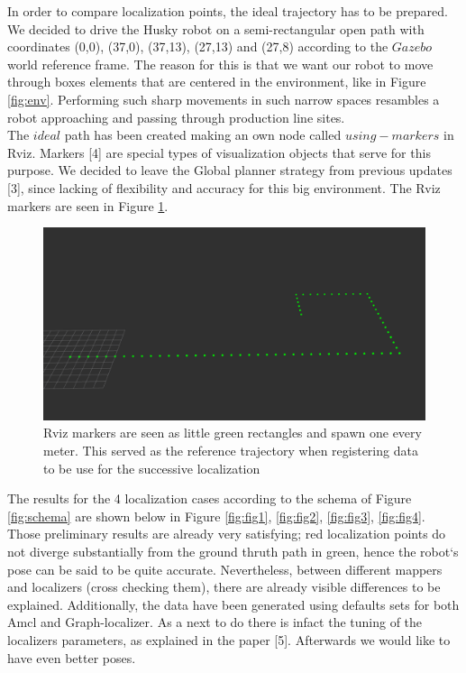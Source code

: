 \documentclass[11pt,a4paper]{article}
\begin{document}
In order to compare localization points, the ideal trajectory has to be prepared. We decided to drive the Husky robot on a semi-rectangular open path with coordinates (0,0), (37,0), (37,13), (27,13) and (27,8) according to the $Gazebo$ world reference frame. The reason for this is that we want our robot to move through boxes elements that are centered in the environment, like in Figure \ref{fig:env}. Performing such sharp movements in such narrow spaces resambles a robot approaching and passing through production line sites. \\
The $ideal$ path has been created making an own node called $using-markers$ in Rviz. Markers [4] are special types of visualization objects that serve for this purpose. We decided to leave the Global planner strategy from previous updates [3], since lacking of flexibility and accuracy for this big environment. The Rviz markers are seen in Figure \ref{fig:markers}.

 \begin{figure}[h]
	\center
	\includegraphics[width=1\textwidth]{figures/globalreference_path.png}
	\caption{Rviz markers are seen as little green rectangles and spawn one every meter. This served as the reference trajectory when registering data to be use for the successive localization}
	\label{fig:markers}
\end{figure}

The results for the 4 localization cases according to the schema of Figure \ref{fig:schema} are shown below in Figure \ref{fig:fig1}, \ref{fig:fig2}, \ref{fig:fig3}, \ref{fig:fig4}. \\
Those preliminary results are already very satisfying; red localization points do not diverge substantially from the ground thruth path in green, hence the robot`s pose can be said to be quite accurate. Nevertheless, between different mappers and localizers (cross checking them), there are already visible differences to be explained. Additionally, the data have been generated using defaults sets for both Amcl and Graph-localizer. As a next to do there is infact the tuning of the localizers parameters, as explained in the paper [5]. Afterwards we would like to have even better poses. 
\end{document}
